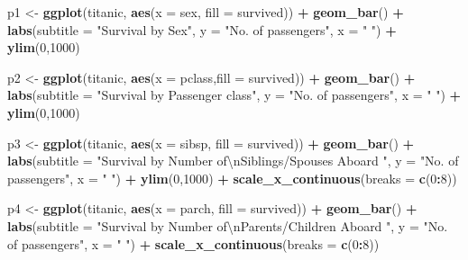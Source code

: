 \documentclass[12,]{article}
\newenvironment{Shaded}{\begin{snugshade}}{\end{snugshade}}
\newcommand{\KeywordTok}[1]{\textcolor[rgb]{0.13,0.29,0.53}{\textbf{#1}}}
\newcommand{\DataTypeTok}[1]{\textcolor[rgb]{0.13,0.29,0.53}{#1}}
\newcommand{\DecValTok}[1]{\textcolor[rgb]{0.00,0.00,0.81}{#1}}
\newcommand{\CharTok}[1]{\textcolor[rgb]{0.31,0.60,0.02}{#1}}
\newcommand{\StringTok}[1]{\textcolor[rgb]{0.31,0.60,0.02}{#1}}
\newcommand{\OperatorTok}[1]{\textcolor[rgb]{0.81,0.36,0.00}{\textbf{#1}}}
\newcommand{\NormalTok}[1]{#1}
\begin{document}
\begin{Shaded}
\begin{Highlighting}[]
\NormalTok{p1 <-}\StringTok{ }\KeywordTok{ggplot}\NormalTok{(titanic, }\KeywordTok{aes}\NormalTok{(}\DataTypeTok{x =}\NormalTok{ sex, }\DataTypeTok{fill =}\NormalTok{ survived)) }\OperatorTok{+}\StringTok{ }
\StringTok{    }\KeywordTok{geom_bar}\NormalTok{() }\OperatorTok{+}\StringTok{ }
\StringTok{    }\KeywordTok{labs}\NormalTok{(}\DataTypeTok{subtitle =} \StringTok{"Survival by Sex"}\NormalTok{, }\DataTypeTok{y =} \StringTok{"No. of passengers"}\NormalTok{, }\DataTypeTok{x =} \StringTok{" "}\NormalTok{) }\OperatorTok{+}
\StringTok{    }\KeywordTok{ylim}\NormalTok{(}\DecValTok{0}\NormalTok{,}\DecValTok{1000}\NormalTok{)}

\NormalTok{p2 <-}\StringTok{ }\KeywordTok{ggplot}\NormalTok{(titanic, }\KeywordTok{aes}\NormalTok{(}\DataTypeTok{x =}\NormalTok{ pclass,}\DataTypeTok{fill =}\NormalTok{ survived)) }\OperatorTok{+}\StringTok{ }
\StringTok{    }\KeywordTok{geom_bar}\NormalTok{() }\OperatorTok{+}\StringTok{ }
\StringTok{    }\KeywordTok{labs}\NormalTok{(}\DataTypeTok{subtitle =} \StringTok{"Survival by Passenger class"}\NormalTok{, }\DataTypeTok{y =} \StringTok{"No. of passengers"}\NormalTok{, }\DataTypeTok{x =} \StringTok{" "}\NormalTok{) }\OperatorTok{+}\StringTok{ }
\StringTok{    }\KeywordTok{ylim}\NormalTok{(}\DecValTok{0}\NormalTok{,}\DecValTok{1000}\NormalTok{)}
    
\NormalTok{p3 <-}\StringTok{ }\KeywordTok{ggplot}\NormalTok{(titanic, }\KeywordTok{aes}\NormalTok{(}\DataTypeTok{x =}\NormalTok{ sibsp, }\DataTypeTok{fill =}\NormalTok{ survived)) }\OperatorTok{+}\StringTok{ }
\StringTok{    }\KeywordTok{geom_bar}\NormalTok{() }\OperatorTok{+}\StringTok{ }
\StringTok{    }\KeywordTok{labs}\NormalTok{(}\DataTypeTok{subtitle =} \StringTok{"Survival by Number of}\CharTok{\textbackslash{}n}\StringTok{Siblings/Spouses Aboard "}\NormalTok{, }
         \DataTypeTok{y =} \StringTok{"No. of passengers"}\NormalTok{, }\DataTypeTok{x =} \StringTok{" "}\NormalTok{) }\OperatorTok{+}\StringTok{ }
\StringTok{    }\KeywordTok{ylim}\NormalTok{(}\DecValTok{0}\NormalTok{,}\DecValTok{1000}\NormalTok{) }\OperatorTok{+}
\StringTok{    }\KeywordTok{scale_x_continuous}\NormalTok{(}\DataTypeTok{breaks =} \KeywordTok{c}\NormalTok{(}\DecValTok{0}\OperatorTok{:}\DecValTok{8}\NormalTok{))}

\NormalTok{p4 <-}\StringTok{ }\KeywordTok{ggplot}\NormalTok{(titanic, }\KeywordTok{aes}\NormalTok{(}\DataTypeTok{x =}\NormalTok{ parch, }\DataTypeTok{fill =}\NormalTok{ survived)) }\OperatorTok{+}\StringTok{ }\KeywordTok{geom_bar}\NormalTok{() }\OperatorTok{+}
\StringTok{    }\KeywordTok{labs}\NormalTok{(}\DataTypeTok{subtitle =} \StringTok{"Survival by Number of}\CharTok{\textbackslash{}n}\StringTok{Parents/Children Aboard "}\NormalTok{, }
         \DataTypeTok{y =} \StringTok{"No. of passengers"}\NormalTok{, }\DataTypeTok{x =} \StringTok{" "}\NormalTok{) }\OperatorTok{+}\StringTok{ }
\StringTok{    }\KeywordTok{scale_x_continuous}\NormalTok{(}\DataTypeTok{breaks =} \KeywordTok{c}\NormalTok{(}\DecValTok{0}\OperatorTok{:}\DecValTok{8}\NormalTok{))}


\end{Highlighting}
\end{Shaded}
\end{document}
